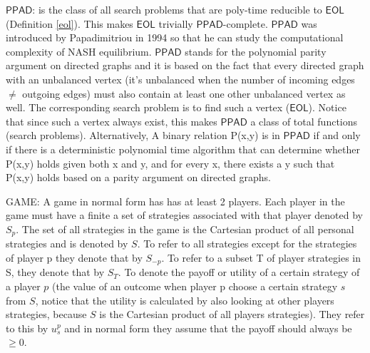 \documentclass[11pt]{article}
\newcommand{\PPAD}{\mathsf{PPAD}}
\newcommand{\PPADc}{\mathsf{PPAD}\text{-complete}}
\newcommand{\eol}{\mathsf{EOL}}
\begin{document}
\begin{definition}
    \label{PPAD}
    $\PPAD$: is the class of all search problems that are poly-time reducible to $\eol$ (Definition \ref{eol}). This makes $\eol$ trivially $\PPADc$. $\PPAD$ was introduced by Papadimitriou in 1994 \cite{PAPADIMITRIOU1994498} so that he can study the computational complexity of NASH equilibrium.
    $\PPAD$ stands for the polynomial parity argument on directed graphs and it is based on the fact that every directed graph with an unbalanced vertex (it's unbalanced when the number of incoming edges $\not =$ outgoing edges) must also contain at least one other unbalanced vertex as well. The corresponding search problem is to find such a vertex ($\eol$). Notice that since such a vertex always exist, this makes $\PPAD$ a class of total functions (search problems).
    Alternatively, A binary relation P(x,y) is in $\PPAD$ if and only if there is a deterministic polynomial time algorithm that can determine whether P(x,y) holds given both x and y, and for every x, there exists a y such that P(x,y) holds based on a parity argument on directed graphs.\\
\end{definition}

\begin{definition}
\label{GAME}
GAME: A game in normal form has has at least 2 players. Each player in the game must have a finite a set of strategies associated with that player denoted by $S_p$. The set of all strategies in the game is the Cartesian product of all personal strategies and is denoted by $S$. To refer to all strategies except for the strategies of player p they denote that by $S_{-p}$. To refer to a subset T of player strategies in S, they denote that by $S_T$. To denote the payoff or utility of a certain strategy of a player $p$ (the value of an outcome when player p choose a certain strategy $s$ from $S$, notice that the utility is calculated by also looking at other players strategies, because $S$ is the Cartesian product of all players strategies). They refer to this by ${u^p_s}$ and in normal form they assume that the payoff should always be $\ge 0$.
\end{definition}
\end{document}
